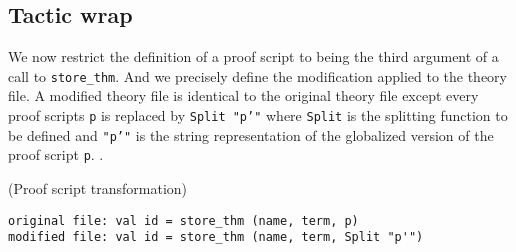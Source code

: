 \documentclass[runningheads,a4paper,draft]{svjour3}
\def\sml{\textsf{SML}\xspace}
\begin{document}
%
%
%
%
%
%
%  
%
%
%
%
%
%
%
%
%
%
%
%


\subsection{Tactic wrap}

We now restrict the definition of a proof script to being the third 
argument of a call to \texttt{store\_thm}. And we precisely define the 
modification applied to the theory file. A modified theory file is identical to 
the original theory file except every proof scripts \texttt{p} is
replaced by \texttt{Split "p'"} where \texttt{Split} is the splitting function 
to be defined and \texttt{"p'"} is the string representation of the globalized 
version of the proof script 
\texttt{p}. 
.
\begin{example}(Proof script transformation)
\begin{lstlisting}[language=SMLSmall,frame=tb]
original file: val id = store_thm (name, term, p)
modified file: val id = store_thm (name, term, Split "p'")
\end{lstlisting}
\end{example}
\end{document}

